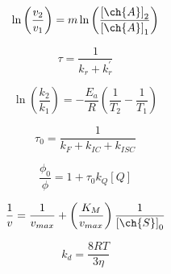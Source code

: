 \documentclass[12pt, letterpaper]{memoir}
\begin{document}
\begin{minipage}[t]{0.5\linewidth}
	\begin{equation*}
		\ln\left(\frac{v_2}{v_1}\right)=m\ln\left(\frac{\left[\ch{A}\right]_2}{\left[\ch{A}\right]_1}\right)
	\end{equation*}

	\begin{equation*}
		\tau = \dfrac{1}{k_r + k_r^\prime}
	\end{equation*}

	\begin{equation*}
		\ln\left(\frac{k_2}{k_1}\right)=-\frac{E_a}{R}\left(\frac{1}{T_2}-\frac{1}{T_1}\right)
	\end{equation*}

	\begin{equation*}
		\tau_0=\dfrac{1}{k_F+k_{IC}+k_{ISC}}
	\end{equation*}

	\begin{equation*}
		\dfrac{\phi_{0}}{\phi} = 1 + \tau_0k_Q[Q]
	\end{equation*}

	\begin{equation*}
		\frac{1}{v}=\frac{1}{v_{max}}+\left(\frac{K_M}{v_{max}}\right)\frac{1}{\left[\ch{S}\right]_0}
	\end{equation*}

	\begin{equation*}
		k_d=\dfrac{8RT}{3\eta}
	\end{equation*}
\end{minipage}
\end{document}
